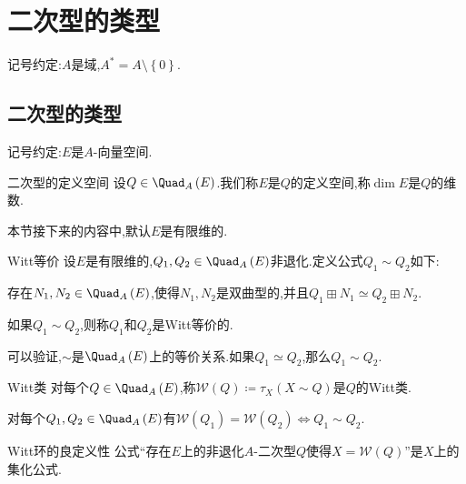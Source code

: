 \chapter{二次型的类型}

记号约定:$A$是域,$A^{\ast}=A\setminus\left\{0\right\}$.

\section{二次型的类型}

记号约定:$E$是$A$-向量空间.

\begin{definition}{二次型的定义空间}{}
	设$Q\in\Quad_{A}\left(E\right)$.我们称$E$是$Q$的定义空间,称$\dim E$是$Q$的维数.
\end{definition}

本节接下来的内容中,默认$E$是有限维的.

\begin{definition}{Witt等价}{}
	设$E$是有限维的,$Q_{1},Q_{2}\in\Quad_{A}\left(E\right)$非退化.定义公式$Q_{1}\sim Q_{2}$如下:
	\begin{center}
		存在$N_{1},N_{2}\in\Quad_{A}\left(E\right)$,使得$N_{1},N_{2}$是双曲型的,并且$Q_{1}\boxplus N_{1}\simeq Q_{2}\boxplus N_{2}$.
	\end{center}
	如果$Q_{1}\sim Q_{2}$,则称$Q_{1}$和$Q_{2}$是Witt等价的.
\end{definition}

\begin{remark}{}{}
	可以验证,$\sim$是$\Quad_{A}\left(E\right)$上的等价关系.如果$Q_{1}\simeq Q_{2}$,那么$Q_{1}\sim Q_{2}$.
\end{remark}

\begin{definition}{Witt类}{}
	对每个$Q\in\Quad_{A}\left(E\right)$,称$\mathcal{W}\left(Q\right)\coloneq\tau_{X}\left(X\sim Q\right)$是$Q$的Witt类.
\end{definition}

\begin{proposition}{}{}
	对每个$Q_{1},Q_{2}\in\Quad_{A}\left(E\right)$有$\mathcal{W}\left(Q_{1}\right)=\mathcal{W}\left(Q_{2}\right)\iff Q_{1}\sim Q_{2}$.
\end{proposition}

\begin{proposition}{Witt环的良定义性}{}
	公式``存在$E$上的非退化$A$-二次型$Q$使得$X=\mathcal{W}\left(Q\right)$''是$X$上的集化公式.
\end{proposition}

